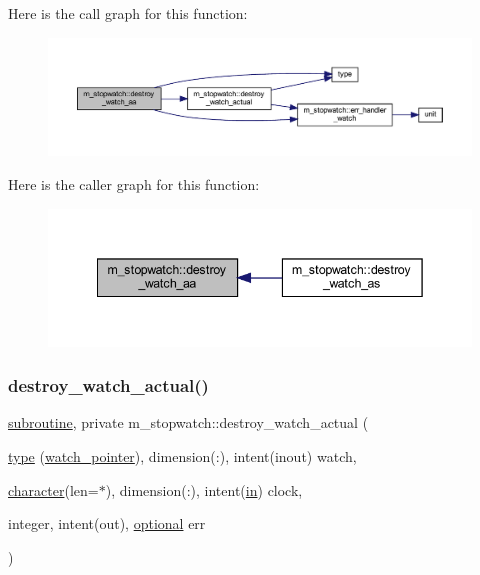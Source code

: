 Here is the call graph for this function\+:
\nopagebreak
\begin{figure}[H]
\begin{center}
\leavevmode
\includegraphics[width=350pt]{namespacem__stopwatch_a797f3a482e663407c89b981f41d7349b_cgraph}
\end{center}
\end{figure}
Here is the caller graph for this function\+:
\nopagebreak
\begin{figure}[H]
\begin{center}
\leavevmode
\includegraphics[width=342pt]{namespacem__stopwatch_a797f3a482e663407c89b981f41d7349b_icgraph}
\end{center}
\end{figure}
\mbox{\label{namespacem__stopwatch_a04d101b90fcf3f9678604f95f9768a63}} 
\subsubsection{\texorpdfstring{destroy\+\_\+watch\+\_\+actual()}{destroy\_watch\_actual()}}
{\footnotesize\ttfamily \hyperlink{M__stopwatch_83_8txt_acfbcff50169d691ff02d4a123ed70482}{subroutine}, private m\+\_\+stopwatch\+::destroy\+\_\+watch\+\_\+actual (\begin{DoxyParamCaption}\item[{\hyperlink{stop__watch_83_8txt_a70f0ead91c32e25323c03265aa302c1c}{type} (\hyperlink{structm__stopwatch_1_1watch__pointer}{watch\+\_\+pointer}), dimension(\+:), intent(inout)}]{watch,  }\item[{\hyperlink{option__stopwatch_83_8txt_abd4b21fbbd175834027b5224bfe97e66}{character}(len=$\ast$), dimension(\+:), intent(\hyperlink{M__journal_83_8txt_afce72651d1eed785a2132bee863b2f38}{in})}]{clock,  }\item[{integer, intent(out), \hyperlink{option__stopwatch_83_8txt_aa4ece75e7acf58a4843f70fe18c3ade5}{optional}}]{err }\end{DoxyParamCaption})\hspace{0.3cm}{\ttfamily [private]}}



